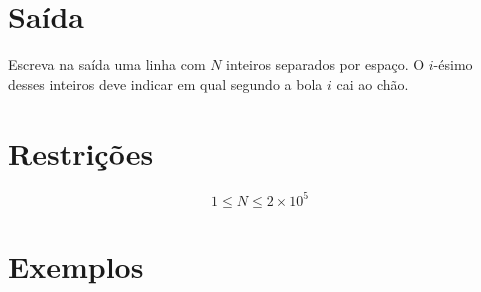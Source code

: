 \section*{Saída}

Escreva na saída uma linha com $N$ inteiros separados por espaço.
O $i$-ésimo desses inteiros deve indicar em qual segundo a bola $i$ cai ao chão.

\section*{Restrições}

$$1 \leq N \leq 2 \times 10^{5}$$

\section*{Exemplos}
\exemplo
